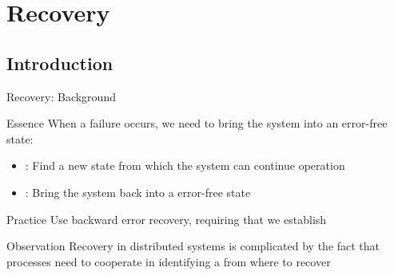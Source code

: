 \section{Recovery}
\subsection{Introduction}
\begin{slide}{Recovery: Background}
  \begin{block}{Essence}
    When a failure occurs, we need to bring the system into an error-free state:
    \begin{itemize}
    \item {}: Find a new state from which the system can continue operation
    \item {}: Bring the system back into a  error-free state
    \end{itemize}
  \end{block}
  \begin{alertblock}{Practice} 
    Use backward error recovery, requiring that we establish 
  \end{alertblock}
  \begin{block}{Observation} 
    Recovery in distributed systems is complicated by the fact that processes need to cooperate in identifying
    a  from where to recover
  \end{block}
\end{slide}
